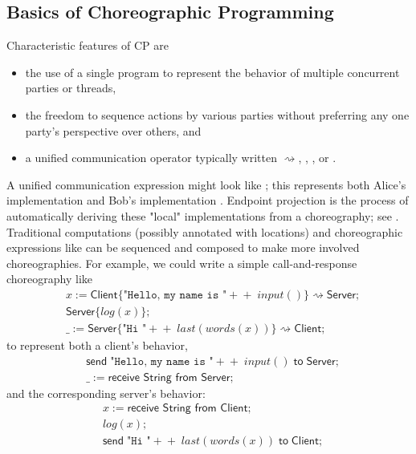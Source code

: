 \subsection{Basics of Choreographic Programming}
Characteristic features of CP are
\begin{itemize}
	\item the use of a single program to represent the behavior of multiple concurrent parties or threads,
	\item the freedom to sequence actions by various parties without preferring any one party's perspective over others, and
	\item a unified communication operator typically written $\rightsquigarrow$, \inlinecode{~>}, , or .
\end{itemize}
A unified communication expression might look like ;
this represents both Alice's implementation 
and Bob's implementation .
Endpoint projection is the process of automatically deriving these "local" implementations from a choreography; see .
Traditional computations (possibly annotated with locations)
and choreographic expressions like  can be sequenced and composed to make more involved choreographies.
For example, we could write a simple call-and-response choreography like
\begin{align*}
  & x := \textsf{Client}\{\texttt{"Hello, my name is "} +\!\!+\; \textit{input}()\} \rightsquigarrow \textsf{Server} ; \\[-0.9em]
  & \textsf{Server}\{\textit{log}(x)\} ; \\[-0.9em]
  & \_ := \textsf{Server}\{\texttt{"Hi "} +\!\!+\; \textit{last}(\textit{words}(x))\} \rightsquigarrow \textsf{Client} ;
\end{align*}
to represent both a client's behavior,
\begin{align*}
  & \textsf{send}\; \texttt{"Hello, my name is "} +\!\!+\; \textit{input}() \;\textsf{to}\; \textsf{Server} ; \\[-0.9em]
  & \_ := \textsf{receive String from Server} ;
\end{align*}
and the corresponding server's behavior:
\begin{align*}
  & x := \textsf{receive String from Client} ; \\[-0.9em]
  & \textit{log}(x) ; \\[-0.9em]
  & \textsf{send}\; \texttt{"Hi "} +\!\!+\; \textit{last}(\textit{words}(x)) \;\textsf{to}\; \textsf{Client} ;
\end{align*}
